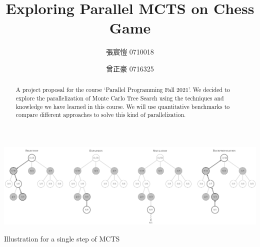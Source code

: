 \documentclass[sigconf]{acmart}
\begin{document}
\title{Exploring Parallel MCTS on Chess Game}


\author{張宸愷 0710018}

\author{曾正豪 0716325}




\begin{abstract}
  A project proposal for the course `Parallel Programming Fall 2021'.
  We decided to explore the parallelization of Monte Carlo Tree Search using the techniques and knowledge we have learned in this course. We will use quantitative benchmarks to compare different approaches to solve this kind of parallelization. 
\end{abstract}





\begin{teaserfigure}
  \includegraphics[width=\textwidth]{MCTS-steps.png}
  \caption{Illustration for a single step of MCTS}
\label{fig:teaser}
\end{teaserfigure}
\end{document}
